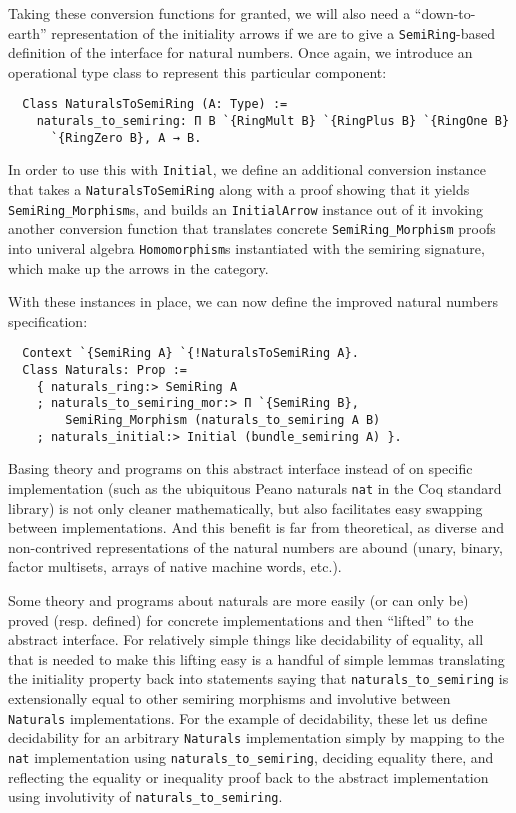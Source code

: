 \documentclass[a4paper,10pt,runningheads]{llncs}
\begin{document}
Taking these conversion functions for granted, we will also need a ``down-to-earth'' representation of the initiality arrows if we are to give a \lstinline|SemiRing|-based definition of the interface for natural numbers. Once again, we introduce an operational type class to represent this particular component:
\begin{lstlisting}
  Class NaturalsToSemiRing (A: Type) :=
    naturals_to_semiring: Π B `{RingMult B} `{RingPlus B} `{RingOne B}
      `{RingZero B}, A → B.
\end{lstlisting}
In order to use this with \lstinline|Initial|, we define an additional conversion instance that takes a \lstinline|NaturalsToSemiRing| along with a proof showing that it yields \lstinline|SemiRing_Morphism|s, and builds an \lstinline|InitialArrow| instance out of it invoking another conversion function that translates concrete \lstinline|SemiRing_Morphism| proofs into univeral algebra \lstinline|Homomorphism|s instantiated with the semiring signature, which make up the arrows in the category.

With these instances in place, we can now define the improved natural numbers specification:
\begin{lstlisting}
  Context `{SemiRing A} `{!NaturalsToSemiRing A}.
  Class Naturals: Prop :=
    { naturals_ring:> SemiRing A
    ; naturals_to_semiring_mor:> Π `{SemiRing B},
        SemiRing_Morphism (naturals_to_semiring A B)
    ; naturals_initial:> Initial (bundle_semiring A) }.
\end{lstlisting}
Basing theory and programs on this abstract interface instead of on specific implementation (such as the ubiquitous Peano naturals \lstinline|nat| in the Coq standard library) is not only cleaner mathematically, but also facilitates easy swapping between implementations. And this benefit is far from theoretical, as diverse and non-contrived representations of the natural numbers are abound (unary, binary, factor multisets, arrays of native machine words, etc.).

Some theory and programs about naturals are more easily (or can only be) proved (resp. defined) for concrete implementations and then ``lifted'' to the abstract interface. For relatively simple things like decidability of equality, all that is needed to make this lifting easy is a handful of simple lemmas translating the initiality property back into statements saying that \lstinline|naturals_to_semiring| is extensionally equal to other semiring morphisms and involutive between \lstinline|Naturals| implementations. For the example of decidability, these let us define decidability for an arbitrary \lstinline|Naturals| implementation simply by mapping to the \lstinline|nat| implementation using \lstinline|naturals_to_semiring|, deciding equality there, and reflecting the equality or inequality proof back to the abstract implementation using involutivity of \lstinline|naturals_to_semiring|.
\end{document}
